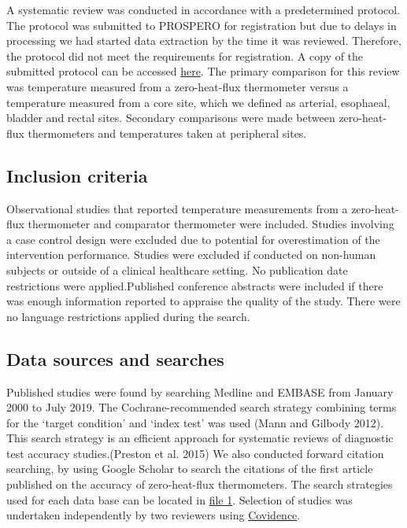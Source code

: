 \documentclass[smallextended]{svjour3}       %
\begin{document}
A systematic review was conducted in accordance with a predetermined
protocol. The protocol was submitted to PROSPERO for registration but
due to delays in processing we had started data extraction by the time
it was reviewed. Therefore, the protocol did not meet the requirements
for registration. A copy of the submitted protocol can be accessed
\href{insert\%20link}{here}. The primary comparison for this review was
temperature measured from a zero-heat-flux thermometer versus a
temperature measured from a core site, which we defined as arterial,
esophaeal, bladder and rectal sites. Secondary comparisons were made
between zero-heat-flux thermometers and temperatures taken at peripheral
sites.

\hypertarget{inclusion-criteria}{%
\subsection{Inclusion criteria}\label{inclusion-criteria}}

Observational studies that reported temperature measurements from a
zero-heat-flux thermometer and comparator thermometer were included.
Studies involving a case control design were excluded due to potential
for overestimation of the intervention performance. Studies were
excluded if conducted on non-human subjects or outside of a clinical
healthcare setting. No publication date restrictions were
applied.Published conference abstracts were included if there was enough
information reported to appraise the quality of the study. There were no
language restrictions applied during the search.

\hypertarget{data-sources-and-searches}{%
\subsection{Data sources and searches}\label{data-sources-and-searches}}

Published studies were found by searching Medline and EMBASE from
January 2000 to July 2019. The Cochrane-recommended search strategy
combining terms for the `target condition' and `index test' was used
(Mann and Gilbody 2012). This search strategy is an efficient approach
for systematic reviews of diagnostic test accuracy studies.(Preston et
al. 2015) We also conducted forward citation searching, by using Google
Scholar to search the citations of the first article published on the
accuracy of zero-heat-flux thermometers. The search strategies used for
each data base can be located in \href{}{file 1}. Selection of studies
was undertaken independently by two reviewers using
\href{https://www.covidence.org}{Covidence}.
\end{document}

